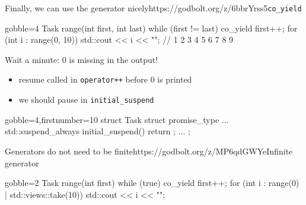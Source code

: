 \begin{frame}[fragile]
  \begin{exampleblockGB}{Finally, we can use the generator nicely}{https://godbolt.org/z/6bbrYrss5}{\texttt{co\_yield}}
    {\scriptsize
      \begin{cppcode*}{gobble=4}
        Task range(int first, int last) {
          while (first != last) {
            co_yield first++;
          }
        }
        for (int i : range(0, 10)) {
          std::cout << i << "";
        } // 1 2 3 4 5 6 7 8 9
      \end{cppcode*}
    }
  \end{exampleblockGB}
  \pause
  \begin{alertblock}{Wait a minute: 0 is missing in the output!}
    \begin{itemize}
    \item resume called in \texttt{operator++} before 0 is printed
    \item we should pause in \texttt{initial_suspend}
    \end{itemize}
     {\scriptsize
      \begin{cppcode*}{gobble=4,firstnumber=10}
        struct Task {
          struct promise_type {
            ...
            std::suspend_always initial_suspend() { return {}; }
            ...
          }
        };
      \end{cppcode*}
    }
  \end{alertblock}
\end{frame}

\begin{frame}[fragile]
  \begin{exampleblockGB}{Generators do not need to be finite}{https://godbolt.org/z/MP6qdGWYe}{Infinite generator}
    \begin{cppcode*}{gobble=2}
      Task range(int first) {
        while (true) {
          co_yield first++;
        }
      }
      for (int i : range(0) | std::views::take(10)) {
        std::cout << i << "\n";
      }
    \end{cppcode*}
  \end{exampleblockGB}
\end{frame}

